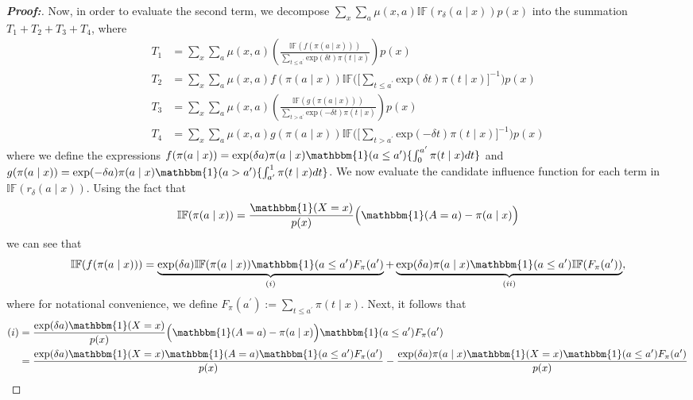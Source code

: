 \documentclass[11pt,twoside]{article}
\theoremstyle{definition}
\theoremstyle{remark}
\begin{document}
\begin{proof}[\textbf{Proof:}]
Now, in order to evaluate the second term, we decompose $\sum_x \sum_a \mu(x, a) \mathbb{IF}( r_\delta(a \mid x)) p(x)$ into the summation $T_1 + T_2 + T_3 + T_4$, where
\begin{align*}
    T_1 &=   \sum_x \sum_a  \mu(x, a) \left( \frac{\mathbb{IF}(f(\pi(a \mid x)))}{\sum_{t \leq a^\prime} \text{exp}(\delta t) \pi(t \mid x)} \right) p(x) \\
    T_2 &= \sum_x \sum_a  \mu(x, a) f(\pi(a \mid x)) \mathbb{IF}\Bigg(\Bigg[\sum_{t \leq a^\prime} \text{exp}(\delta t) \pi(t \mid x) \Bigg]^{-1} \Bigg) p(x) \\
    T_3 &=  \sum_x \sum_a  \mu(x, a)\left(\frac{\mathbb{IF}(g(\pi(a \mid x)))}{ \sum_{t > a^\prime} \text{exp}(-\delta t) \pi(t \mid x)}\right) p(x) \\
    T_4 &=  \sum_x \sum_a  \mu(x, a) g(\pi(a \mid x)) \mathbb{IF}\Bigg(\Bigg[\sum_{t > a^\prime} \text{exp}(-\delta t) \pi(t \mid x) \Bigg]^{-1} \Bigg) p(x)
\end{align*}
where we define the expressions $f(\pi(a \mid x)) = \text{exp}(\delta a) \pi(a \mid x) \mathbbm{1}(a \leq a^\prime)\{ \int^{a^\prime}_0 \pi(t \mid x) dt \}$ and $g(\pi(a \mid x)) = \text{exp}(-\delta a) \pi(a \mid x) \mathbbm{1}(a > a^\prime) \{ \int^{1}_{a^\prime} \pi(t \mid x) dt\}$. We now evaluate the candidate influence function for each term in $\mathbb{IF}(r_\delta(a \mid x))$. Using the fact that
\begin{align*}
    \mathbb{IF}(\pi(a\mid x)) = \frac{\mathbbm{1}(X = x)}{p(x)} \Big( \mathbbm{1}(A = a) - \pi(a \mid x) \Big)
\end{align*}
we can see that
\begin{align*}
    \mathbb{IF}(f(\pi(a \mid x))) = \underbrace{\exp(\delta a) \mathbb{IF}( \pi(a \mid x)) \mathbbm{1}(a \leq a^\prime) F_{\pi}(a^\prime)}_{(i)} + \underbrace{\exp(\delta a) \pi(a \mid x) \mathbbm{1}(a \leq a^\prime) \mathbb{IF}(F_{\pi}(a^\prime) )}_{(ii)},
\end{align*}
where for notational convenience, we define $F_{\pi}(a^\prime) := \sum_{t \leq a^\prime} \pi(t \mid x)$. Next, it follows that
\begin{align*}
    (i) &= \frac{\exp(\delta a) \mathbbm{1}(X = x)}{p(x)} \Big( \mathbbm{1}(A = a) - \pi(a \mid x)\Big)\mathbbm{1}(a \leq a^\prime)F_{\pi}(a^\prime) \\
    &= \frac{\exp(\delta a) \mathbbm{1}(X = x) \mathbbm{1}(A = a) \mathbbm{1}(a \leq a^\prime) F_{\pi}(a^\prime) }{p(x)}  - \frac{ \exp(\delta a) \pi(a \mid x)  \mathbbm{1}(X = x)\mathbbm{1}(a \leq a^\prime) F_{\pi}(a^\prime)}{p(x)} 

\end{align*}
\end{proof}
\end{document}
